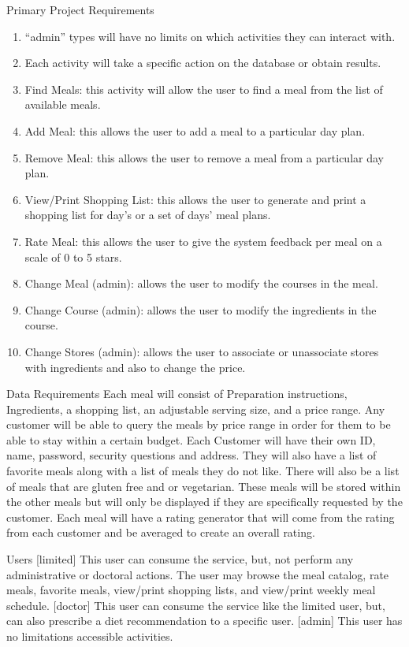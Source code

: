 \documentclass[a4paper,10pt]{article}
\begin{document}
\begin{mySubsection}{Primary Project Requirements}
\begin{enumerate}
\item
“admin” types will have no limits on which activities they can interact with.
\item
Each activity will take a specific action on the database or obtain results.
\item
Find Meals: this activity will allow the user to find a meal from the list of available meals.
\item
Add Meal: this allows the user to add a meal to a particular day plan.
\item
Remove Meal: this allows the user to remove a meal from a particular day plan.
\item
View/Print Shopping List: this allows the user to generate and print a shopping list for day’s or a set of days’ meal plans.
\item
Rate Meal: this allows the user to give the system feedback per meal on a scale of 0 to 5 stars.
\item
Change Meal (admin): allows the user to modify the courses in the meal.
\item
Change Course (admin): allows the user to modify the ingredients in the course.
\item
Change Stores (admin): allows the user to associate or unassociate stores with ingredients and also to change the price.
\end{enumerate}
\end{mySubsection}
\begin{mySubsection}{Data Requirements}
Each meal will consist of Preparation instructions, Ingredients, a shopping list, an adjustable serving size, and a price range. Any customer will be able to query the meals by price range in order for them to be able to stay within a certain budget.
Each Customer will have their own ID, name, password, security questions and address. They will also have a list of favorite meals along with a list of meals they do not like.
There will also be a list of meals that are gluten free and or vegetarian. These meals will be stored within the other meals but will only be displayed if they are specifically requested by the customer.
Each meal will have a rating generator that will come from the rating from each customer and be averaged to create an overall rating.
\end{mySubsection}
\begin{mySubsection}{Users}
[limited] This user can consume the service, but, not perform any administrative or doctoral actions. The user may browse the meal catalog, rate meals, favorite meals, view/print shopping lists, and view/print weekly meal schedule.
[doctor] This user can consume the service like the limited user, but, can also prescribe a diet recommendation to a specific user.
[admin] This user has no limitations accessible activities.
\end{mySubsection}
\end{document}

